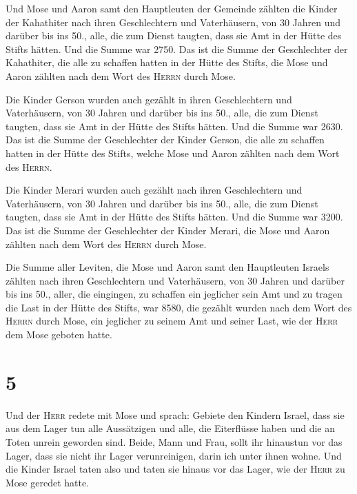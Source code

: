  Und Mose und Aaron samt den Hauptleuten der Gemeinde
zählten die Kinder der Kahathiter nach ihren Geschlechtern und
Vaterhäusern,  von 30 Jahren und darüber bis ins 50.,
alle, die zum Dienst taugten, dass sie Amt in der Hütte des Stifts
hätten.  Und die Summe war 2750.  Das ist
die Summe der Geschlechter der Kahathiter, die alle zu schaffen hatten
in der Hütte des Stifts, die Mose und Aaron zählten nach dem Wort des
\textsc{Herrn} durch Mose.

 Die Kinder Gerson wurden auch gezählt in ihren
Geschlechtern und Vaterhäusern,  von 30 Jahren und
darüber bis ins 50., alle, die zum Dienst taugten, dass sie Amt in der
Hütte des Stifts hätten.  Und die Summe war 2630.
 Das ist die Summe der Geschlechter der Kinder Gerson,
die alle zu schaffen hatten in der Hütte des Stifts, welche Mose und
Aaron zählten nach dem Wort des \textsc{Herrn}.

 Die Kinder Merari wurden auch gezählt nach ihren
Geschlechtern und Vaterhäusern,  von 30 Jahren und
darüber bis ins 50., alle, die zum Dienst taugten, dass sie Amt in der
Hütte des Stifts hätten.  Und die Summe war 3200.
 Das ist die Summe der Geschlechter der Kinder Merari,
die Mose und Aaron zählten nach dem Wort des \textsc{Herrn} durch Mose.

 Die Summe aller Leviten, die Mose und Aaron samt den
Hauptleuten Israels zählten nach ihren Geschlechtern und Vaterhäusern,
 von 30 Jahren und darüber bis ins 50., aller, die
eingingen, zu schaffen ein jeglicher sein Amt und zu tragen die Last in
der Hütte des Stifts,  war 8580,  die
gezählt wurden nach dem Wort des \textsc{Herrn} durch Mose, ein
jeglicher zu seinem Amt und seiner Last, wie der \textsc{Herr} dem Mose
geboten hatte.

\hypertarget{section-4}{%
\section{5}\label{section-4}}

 Und der \textsc{Herr} redete mit Mose und sprach:
 Gebiete den Kindern Israel, dass sie aus dem Lager tun
alle Aussätzigen und alle, die Eiterflüsse haben und die an Toten unrein
geworden sind.  Beide, Mann und Frau, sollt ihr hinaustun
vor das Lager, dass sie nicht ihr Lager verunreinigen, darin ich unter
ihnen wohne.  Und die Kinder Israel taten also und taten
sie hinaus vor das Lager, wie der \textsc{Herr} zu Mose geredet hatte.

